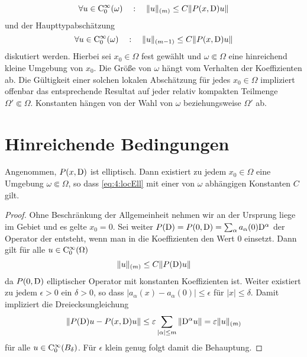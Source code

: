 \begin{equation}\label{eq:4:locEll}
\forall u\in\mathrm C_0^\infty(\omega)\quad:\quad    \| u\|_{(m)} \le C \| P(x,\mathrm D) u \|
\end{equation}
und der Haupttypabschätzung 
\begin{equation}\label{eq:4:locHT}
\forall u\in\mathrm C_0^\infty(\omega)\quad:\quad   \| u\|_{(m-1)} \le C \| P(x,\mathrm D) u \|
\end{equation}
diskutiert werden. Hierbei sei $x_0\in\Omega$ fest gewählt und $\omega\Subset\Omega$ eine hinreichend kleine Umgebung von $x_0$. Die Größe von $\omega$ hängt vom Verhalten der Koeffizienten ab. Die Gültigkeit einer solchen lokalen Abschätzung für jedes $x_0\in\Omega$ impliziert offenbar das entsprechende Resultat auf jeder relativ kompakten Teilmenge $\Omega'\Subset\Omega$. Konstanten hängen von der Wahl von $\omega$ beziehungsweise $\Omega'$ ab.



\section{Hinreichende Bedingungen}


\begin{thm}
Angenommen, $P(x,\mathrm D)$ ist elliptisch. Dann existiert zu jedem $x_0\in\Omega$ eine Umgebung $\omega\Subset\Omega$, so dass
\eqref{eq:4:locEll} mit einer von $\omega$ abhängigen Konstanten $C$ gilt. 
\end{thm}
\begin{proof}
Ohne Beschränkung der Allgemeinheit nehmen wir an der Ursprung liege im Gebiet und es gelte $x_0=0$. Sei weiter $P(\mathrm D)=P(0,\mathrm D)=\sum_\alpha a_\alpha(0)\mathrm D^\alpha$ der Operator der entsteht, wenn man in die Koeffizienten den Wert $0$ einsetzt. Dann gilt für alle $u\in\mathrm C_0^\infty(\Omega)$
\begin{equation}
 \|u\|_{(m)} \le C  \| P(\mathrm D) u\| 
\end{equation}
da $P(0,\mathrm D)$ elliptischer Operator mit konstanten Koeffizienten ist. Weiter existiert zu jedem $\epsilon>0$ ein $\delta>0$, so dass
$|a_\alpha(x)-a_\alpha(0)|\le \epsilon$ für $|x|\le\delta$. Damit impliziert die Dreiecksungleichung
\begin{equation}
  \| P(\mathrm D) u - P(x,\mathrm D) u\| \le \varepsilon \sum_{|\alpha|\le m} \|\mathrm D^\alpha u\| = \varepsilon \|u\|_{(m)}
\end{equation}
für alle $u\in\mathrm C_0^\infty(B_\delta)$. Für $\epsilon$ klein genug folgt damit die Behauptung.
\end{proof}

